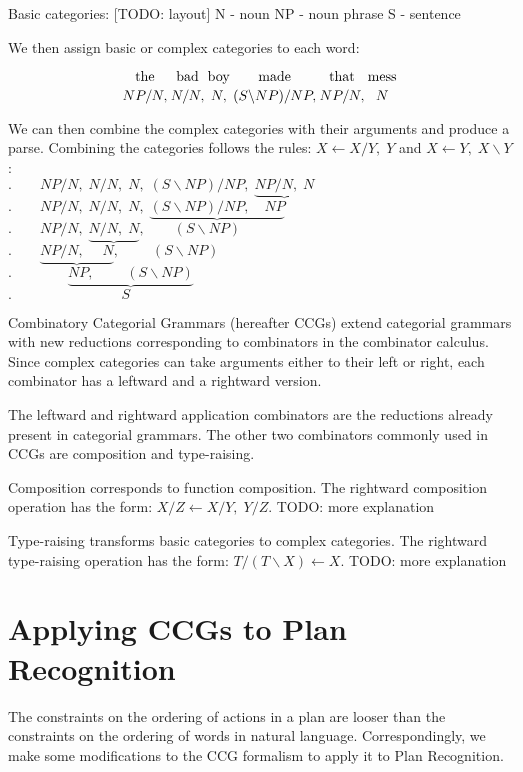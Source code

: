 Basic categories:
[TODO: layout]
N - noun
NP - noun phrase
S - sentence

We then assign basic or complex categories to each word:

$$
{\text{the}\atop {NP/N,}}
{\text{bad}\atop {N/N,}}
{\text{boy}\atop {N,}}
{\text{made}\atop {(S \backslash NP)/NP,}}
{\text{that}\atop {NP/N,}}
{\text{mess}\atop {N}}
$$

We can then combine the complex categories with their arguments and produce a parse. Combining the categories follows the rules: $ X\leftarrow X/Y,\; Y$ and $ X\leftarrow Y,\; X\backslash Y$:\\
$.\qquad NP/N,\; N/N,\; N,\; (S\backslash NP)/NP,\; \underbrace{NP/N,\; N}$\\
$.\qquad NP/N,\; N/N,\; N,\; \underbrace{(S\backslash NP)/NP, \quad NP}$\\
$.\qquad NP/N,\; \underbrace{N/N,\; N}, \qquad (S\backslash NP)$\\
$.\qquad \underbrace{NP/N,\; \quad N},\; \qquad (S\backslash NP)$\\
$.\qquad \qquad\underbrace{NP,\; \qquad (S\backslash NP)}$\\
$.\qquad \qquad\qquad\quad\;\;\; S$


Combinatory Categorial Grammars (hereafter \ac{CCG}s) extend categorial grammars with new reductions corresponding to combinators in the combinator calculus. Since complex categories can take arguments either to their left or right, each combinator has a leftward and a rightward version.

The leftward and rightward application combinators are the reductions already present in categorial grammars. The other two combinators commonly used in CCGs are composition and type-raising.

Composition corresponds to function composition. The rightward composition operation has the form: $X/Z \leftarrow X/Y,\;  Y/Z$. TODO: more explanation

Type-raising transforms basic categories to complex categories. The rightward type-raising operation has the form: $T/(T\backslash X) \leftarrow X$. TODO: more explanation

\section{Applying CCGs to Plan Recognition}

The constraints on the ordering of actions in a plan are looser than the constraints on the ordering of words in natural language. Correspondingly, we make some modifications to the \ac{CCG} formalism to apply it to Plan Recognition.


